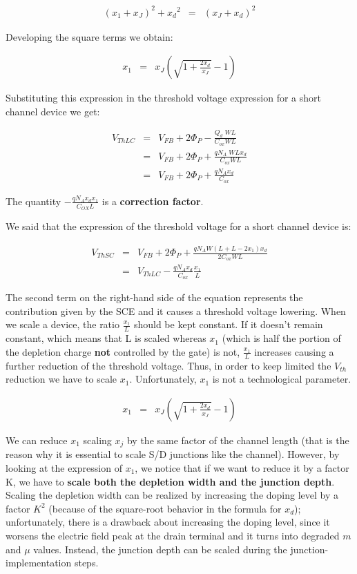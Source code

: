 \documentclass[a4paper, 12pt, twoside, openright]{report}
\begin{document}
	\begin{eqnarray*}
	 \left(x_1+ x_J\right)^2 + {x_d}^2 &=& \left(x_J+ x_d \right)^2
	\end{eqnarray*}

Developing the square terms we obtain:

	\begin{eqnarray*}
	   x_1&=& x_J \left(\sqrt{1+\frac{2x_d}{x_J}} -1 \right)
	\end{eqnarray*}

Substituting this expression in the threshold voltage expression for a short channel device we get:

	\begin{eqnarray*}
	   V_{ThLC}&=& V_{FB}+2\Phi_P-\frac{Q_d\;WL}{C_{ox}WL}\\
	           &=& V_{FB}+2\Phi_P+\frac{qN_A\;WL x_d}{C_{ox}WL}\\
	           &=& V_{FB}+2\Phi_P+\frac{qN_A x_d}{C_{ox}}
	\end{eqnarray*}

The quantity $- \frac{q N_A x_d x_1}{C_{OX}L}$ is a \textbf{correction factor}.

We said that the expression of the threshold voltage for a short channel device is:

	\begin{eqnarray*}
	   V_{ThSC}&=& V_{FB}+2\Phi_P+\frac{qN_AW\left(L+L-2x_1\right)x_d}{2 C_{ox}WL}\\
	           &=& V_{ThLC} - \frac{qN_A x_d}{C_{ox}}\frac{x_1}{L}
	\end{eqnarray*}

The second term on the right-hand side of the equation represents the contribution given by the SCE and it causes a threshold voltage lowering. When we scale a device, the ratio $\frac{x_1}{L}$ should be kept constant. If it doesn't remain constant, which means that L is scaled whereas $x_{1}$ (which is half the portion of the depletion charge \textbf{not} controlled by the gate) is not, $\frac{x_1}{L}$ increases causing a further reduction of the threshold voltage. Thus, in order to keep limited the $V_{th}$ reduction we have to scale $x_{1}$. Unfortunately, $x_{1}$ is not a technological parameter.

	\begin{eqnarray*}
	   x_1&=& x_J \left(\sqrt{1+\frac{2x_d}{x_J}} -1 \right)
	\end{eqnarray*}

We can reduce $x_{1}$ scaling $x_{j}$ by the same factor of the channel length (that is the reason why it is essential to scale S/D junctions like the channel). However, by looking at the expression of $x_{1}$, we notice that if we want to reduce it by a factor K, we have to \textbf{scale both the depletion width and the junction depth}. Scaling the depletion width can be realized by increasing the doping level by a factor $K^2$ (because of the square-root behavior in the formula for $x_{d}$); unfortunately, there is a drawback about increasing the doping level, since it worsens the electric field peak at the drain terminal and it turns into degraded $m$ and $\mu$ values. Instead, the junction depth can be scaled during the junction-implementation steps.
\end{document}

